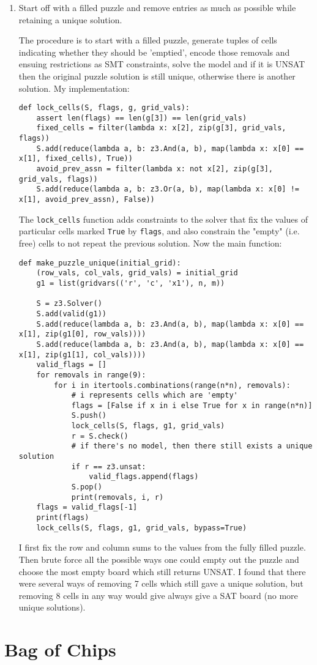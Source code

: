 \begin{enumerate}[label=(\alph*)]
  \item {\color{blue}Start off with a filled puzzle and remove entries as much as possible while retaining a unique solution.}

    The procedure is to start with a filled puzzle, generate tuples of cells indicating whether they should be 'emptied', encode those removals and ensuing restrictions as SMT constraints, solve the model and if it is UNSAT then the original puzzle solution is still unique, otherwise there is another solution. My implementation:

    \begin{verbatim}
def lock_cells(S, flags, g, grid_vals):
    assert len(flags) == len(g[3]) == len(grid_vals)
    fixed_cells = filter(lambda x: x[2], zip(g[3], grid_vals, flags))
    S.add(reduce(lambda a, b: z3.And(a, b), map(lambda x: x[0] == x[1], fixed_cells), True))
    avoid_prev_assn = filter(lambda x: not x[2], zip(g[3], grid_vals, flags))
    S.add(reduce(lambda a, b: z3.Or(a, b), map(lambda x: x[0] != x[1], avoid_prev_assn), False))
    \end{verbatim}

    The \texttt{lock\_cells} function adds constraints to the solver that fix the values of particular cells marked \texttt{True} by \texttt{flags}, and also constrain the "empty" (i.e. free) cells to not repeat the previous solution. Now the main function:

    \begin{verbatim}
def make_puzzle_unique(initial_grid):
    (row_vals, col_vals, grid_vals) = initial_grid
    g1 = list(gridvars(('r', 'c', 'x1'), n, m))

    S = z3.Solver()
    S.add(valid(g1))
    S.add(reduce(lambda a, b: z3.And(a, b), map(lambda x: x[0] == x[1], zip(g1[0], row_vals))))
    S.add(reduce(lambda a, b: z3.And(a, b), map(lambda x: x[0] == x[1], zip(g1[1], col_vals))))
    valid_flags = []
    for removals in range(9):
        for i in itertools.combinations(range(n*n), removals):
            # i represents cells which are 'empty'
            flags = [False if x in i else True for x in range(n*n)]
            S.push()
            lock_cells(S, flags, g1, grid_vals)
            r = S.check()
            # if there's no model, then there still exists a unique solution
            if r == z3.unsat:
                valid_flags.append(flags)
            S.pop()
            print(removals, i, r)
    flags = valid_flags[-1]
    print(flags)
    lock_cells(S, flags, g1, grid_vals, bypass=True)
    \end{verbatim}

    I first fix the row and column sums to the values from the fully filled puzzle. Then brute force all the possible ways one could empty out the puzzle and choose the most empty board which still returns UNSAT. I found that there were several ways of removing 7 cells which still gave a unique solution, but removing 8 cells in any way would give always give a SAT board (no more unique solutions).
\end{enumerate}

\section{Bag of Chips}

